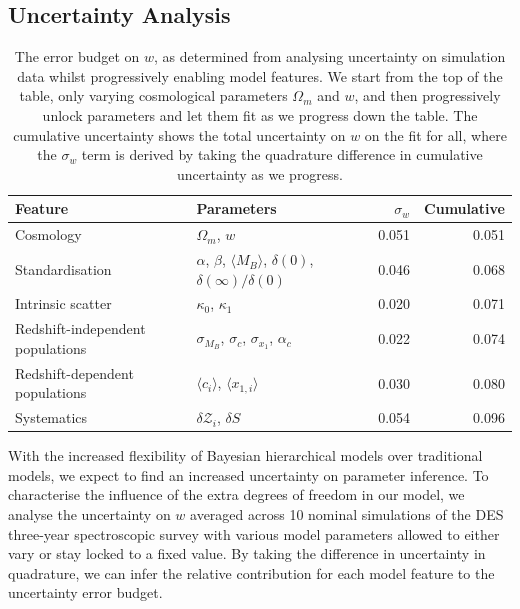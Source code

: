 \documentclass[a4paper,fleqn,usenatbib]{mnras}
\begin{document}
\subsection{Uncertainty Analysis}
\label{sec:ucnert}

\begin{table}
	\centering
	\caption{The error budget on $w$, as determined from analysing uncertainty on simulation data whilst progressively enabling model features. We start from the top of the table, only varying cosmological parameters $\Omega_m$ and $w$, and then progressively unlock parameters and let them fit as we progress down the table. The cumulative uncertainty shows the total uncertainty on $w$ on the fit for all, where the $\sigma_w$ term is derived by taking the quadrature difference in cumulative uncertainty as we progress.}
	\label{tab:uncert}
	\begin{tabular}{l|l|rr}
		Feature &  Parameters & $\sigma_w$ & Cumulative  \\
		\hline
		Cosmology                      & $\Omega_m$, $w$ & 0.051  &   0.051       \\
		Standardisation                & $\alpha$, $\beta$, $\langle M_B \rangle$, $\delta(0)$, $\delta(\infty)/\delta(0)$ & 0.046  &   0.068       \\
		Intrinsic scatter              & $\kappa_0$, $\kappa_1$ & 0.020  &   0.071       \\
		Redshift-independent populations             & $\sigma_{M_B}$, $\sigma_c$, $\sigma_{x_1}$, $\alpha_c$ & 0.022  &   0.074       \\
		Redshift-dependent populations & $\langle c_i \rangle$, $\langle x_{1,i} \rangle$ & 0.030  &   0.080   \\
		Systematics                    & $\delta \mathcal{Z}_i$, $\delta S$ & 0.054  &   0.096      \\ 
		\hline
	\end{tabular}
\end{table}

With the increased flexibility of Bayesian hierarchical models over traditional models, we expect to find an increased uncertainty on parameter inference. To characterise the influence of the extra degrees of freedom in our model, we analyse the uncertainty on $w$ averaged across 10 nominal simulations of the DES three-year spectroscopic survey with various model parameters allowed to either vary or stay locked to a fixed value. By taking the difference in uncertainty in quadrature, we can infer the relative contribution for each model feature to the uncertainty error budget.
\end{document}
